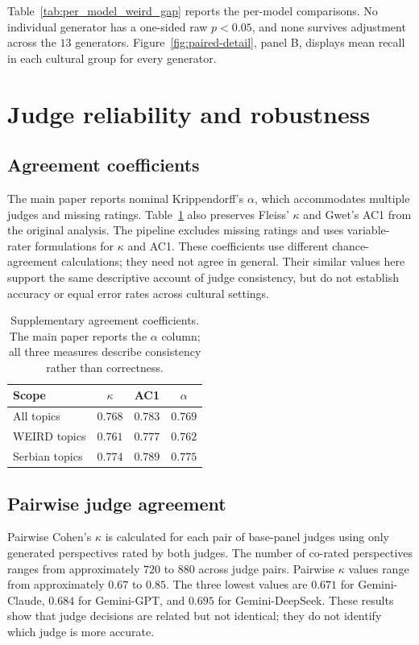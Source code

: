 \documentclass[11pt,a4paper]{article}
\begin{document}
Table~\ref{tab:per_model_weird_gap} reports the per-model comparisons. No individual generator has a one-sided raw $p<0.05$, and none survives adjustment across the $13$ generators.
Figure~\ref{fig:paired-detail}, panel B, displays mean recall in each cultural group for every generator.

\section{Judge reliability and robustness}
\label{app:reliability}

\subsection{Agreement coefficients}
\label{app:agreement_coefficients}
The main paper reports nominal Krippendorff's $\alpha$, which accommodates multiple judges and missing ratings. Table~\ref{tab:agreement-supplement} also preserves Fleiss' $\kappa$ and Gwet's AC1 from the original analysis. The pipeline excludes missing ratings and uses variable-rater formulations for $\kappa$ and AC1. These coefficients use different chance-agreement calculations; they need not agree in general. Their similar values here support the same descriptive account of judge consistency, but do not establish accuracy or equal error rates across cultural settings.

\begin{table}[!htbp]
\centering
\small
\caption{Supplementary agreement coefficients. The main paper reports the $\alpha$ column; all three measures describe consistency rather than correctness.}
\label{tab:agreement-supplement}
\begin{tabular*}{\columnwidth}{@{\extracolsep{\fill}}lccc@{}}
\toprule
Scope & $\kappa$ & AC1 & $\alpha$\\
\midrule
All topics & $0.768$ & $0.783$ & $0.769$\\
WEIRD topics & $0.761$ & $0.777$ & $0.762$\\
Serbian topics & $0.774$ & $0.789$ & $0.775$\\
\bottomrule
\end{tabular*}
\end{table}

\subsection{Pairwise judge agreement}
\label{app:pairwise_judges}

Pairwise Cohen's $\kappa$ is calculated for each pair of base-panel judges using only generated perspectives rated by both judges. The number of co-rated perspectives ranges from approximately $720$ to $880$ across judge pairs. Pairwise $\kappa$ values range from approximately $0.67$ to $0.85$. The three lowest values are $0.671$ for Gemini-Claude, $0.684$ for Gemini-GPT, and $0.695$ for Gemini-DeepSeek. These results show that judge decisions are related but not identical; they do not identify which judge is more accurate.
\end{document}
